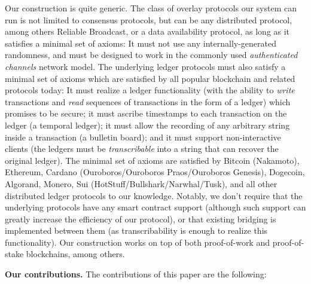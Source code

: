Our construction is quite generic.
The class of overlay protocols our system can run is not limited to consensus protocols,
but can be any distributed protocol, among others Reliable Broadcast, or a data availability
protocol, as long as it satisfies a minimal set of axioms: It must not use any
internally-generated randomness, and must be designed to work in the commonly used
\emph{authenticated channels} network model. The underlying ledger protocols must also
satisfy a minimal set of axioms which are satisfied by all popular blockchain and
related protocols today: It must realize a ledger functionality (with the ability
to \emph{write} transactions and \emph{read} sequences of transactions in the form of a ledger)
which promises to be secure; it must ascribe timestamps to each transaction on the ledger (a temporal ledger);
it must allow the recording of any arbitrary string inside a transaction (a bulletin board);
and it must support non-interactive clients (the ledgers must be \emph{transcribable}
into a string that can recover the original ledger).
The minimal set of axioms are satisfied by Bitcoin (Nakamoto), Ethereum, Cardano
(Ouroboros/Ouroboros Praos/Ouroboros Genesis), Dogecoin, Algorand, Monero, Sui
(HotStuff/Bullshark/Narwhal/Tusk), and all other distributed ledger protocols
to our knowledge. Notably, we don't require that the underlying protocols have
any smart contract support (although such support can greatly increase the efficiency
of our protocol), or that existing bridging is implemented between them (as
transcribability is enough to realize this functionality). Our construction works on
top of both proof-of-work and proof-of-stake blockchains, among others.

\noindent
\textbf{Our contributions.} The contributions of this paper are the following:

